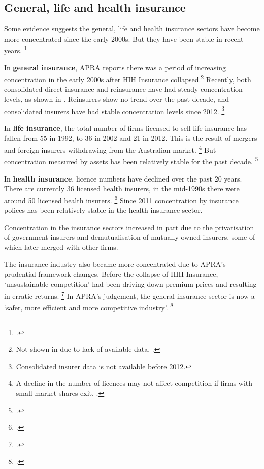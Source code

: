 \subsection{General, life and health insurance}

Some evidence suggests the general, life and health insurance sectors have become more concentrated since the early 2000s. But they have been stable in recent years.%
\footcites{APRA_insurance_2017}{APRA_FSI_2014}

In \textbf{general insurance},  APRA reports there was a period of increasing concentration in the early 2000s after HIH Insurance collapsed.\footnote{Not shown in  due to lack of available data. \textcite{APRA_FSI_2014}.} Recently, both consolidated direct insurance and reinsurance have had steady concentration levels, as shown in . Reinsurers show no trend over the past decade, and consolidated insurers have had stable concentration levels since 2012.%
  \footnote{Consolidated insurer data is not available before 2012.}


In \textbf{life insurance}, the total number of firms licensed to sell life insurance has fallen from 55 in 1992, to 36 in 2002 and 21 in 2012. This is the result of mergers and foreign insurers withdrawing from the Australian market.%
\footnote{A decline in the number of licences may not affect competition if firms with small market shares exit. \textcite{APRA_insight_insurance}.} But concentration measured by assets has been relatively stable for the past decade.%
\footcite{APRA_PC_Sub_2017}

In \textbf{health insurance}, licence numbers have declined over the past 20 years. There are currently 36 licensed health insurers, in the mid-1990s there were around 50 licensed health insurers.%
\footcites{PHIAC-competition-health}{APRA_PC_Sub_2017} Since 2011 concentration by insurance polices has been relatively stable in the health insurance sector.

Concentration in the insurance sectors increased in part due to the privatisation of government insurers and demutualisation of mutually owned insurers, some of which later merged with other firms.

The insurance industry also became more concentrated due to APRA's prudential framework changes.
Before the collapse of HIH Insurance, `unsustainable competition' had been driving down premium prices and resulting in erratic returns.
  \footcite[][23--24]{APRA_FSI_2014}
In APRA's judgement, the general insurance sector is now a `safer, more efficient and more competitive industry'.%
  \footcite[][23]{APRA_FSI_2014}


